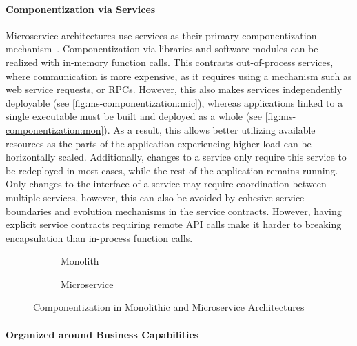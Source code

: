 \paragraph{Componentization via Services}

Microservice architectures use services as their primary componentization mechanism~\cite{Lewis2014, Dragoni2017}.
Componentization via libraries and software modules can be realized with in-memory function calls.
This contrasts out-of-process services, where communication is more expensive, as it requires using a mechanism such as web service requests, or \acp{RPC}.
However, this also makes services independently deployable (see \autoref{fig:ms-componentization:mic}), whereas applications linked to a single executable must be built and deployed as a whole (see \autoref{fig:ms-componentization:mon}).
As a result, this allows better utilizing available resources as the parts of the application experiencing higher load can be horizontally scaled.
Additionally, changes to a service only require this service to be redeployed in most cases, while the rest of the application remains running.
Only changes to the interface of a service may require coordination between multiple services, however, this can also be avoided by cohesive service boundaries and evolution mechanisms in the service contracts.
However, having explicit service contracts requiring remote \ac{API} calls make it harder to breaking encapsulation than in-process function calls.

\begin{figure}[!htb]
    \centering
    \begin{subfigure}{.5\textwidth}
        \centering
        
        \caption{Monolith}\label{fig:ms-componentization:mon}
    \end{subfigure}%
    \begin{subfigure}{.5\textwidth}
        \centering
        
        \caption{Microservice}\label{fig:ms-componentization:mic}
    \end{subfigure}
    \caption{Componentization in Monolithic and Microservice Architectures~\cite{Lewis2014}}\label{fig:ms-componentization}
\end{figure}

\paragraph{Organized around Business Capabilities}

